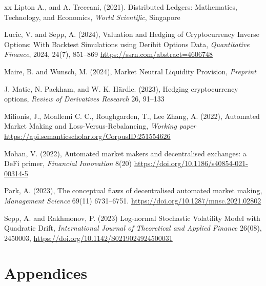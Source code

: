 \documentclass[pdftex,11pt,a4paper] {article}
\begin{document}
\begin{thebibliography}{xx}
Lipton A., and A. Treccani, (2021). Distributed Ledgers: Mathematics,
Technology, and Economics, \emph{World Scientific}, Singapore

 Lucic, V. and
Sepp, A. (2024), Valuation and Hedging of Cryptocurrency Inverse Options:
With Backtest Simulations using Deribit Options Data, \emph{Quantitative
Finance}, 2024, 24(7), 851--869 \url{https://ssrn.com/abstract=4606748}

 Maire, B.
and Wunsch, M. (2024), Market Neutral Liquidity Provision, \emph{Preprint}

 J. Matic, N. Packham, and W. K. H\"ardle. (2023), Hedging cryptocurrency options, \emph{Review of Derivatives Research} 26, 91--133

 Milionis, J.,
Moallemi C. C., Roughgarden, T., Lee Zhang, A. (2022), Automated Market
Making and Loss-Versus-Rebalancing, \emph{Working paper} %
\url{https://api.semanticscholar.org/CorpusID:251554626}

 Mohan, V. (2022),
Automated market makers and decentralised exchanges: a DeFi primer, \emph{%
Financial Innovation} 8(20) \url{https://doi.org/10.1186/s40854-021-00314-5}

 Park, A. (2023), The
conceptual flaws of decentralised automated market making, \emph{Management
Science} 69(11) 6731--6751. \url{https://doi.org/10.1287/mnsc.2021.02802}

 Sepp,
A. and Rakhmonov, P. (2023) Log-normal Stochastic Volatility Model with
Quadratic Drift, \emph{International Journal of Theoretical and Applied
Finance} 26(08), 2450003, \url{https://doi.org/10.1142/S0219024924500031}


\end{thebibliography}



\section*{Appendices}
\end{document}
